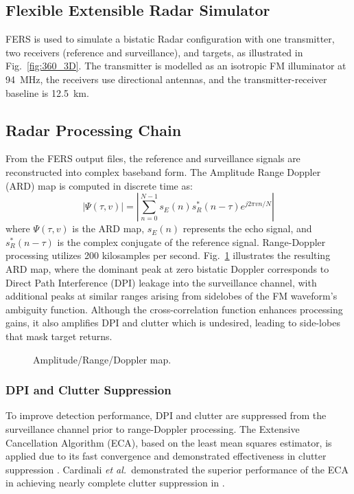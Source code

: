 \documentclass[conference]{IEEEtran}
\begin{document}
\subsection{Flexible Extensible Radar Simulator}

FERS \cite{fersMarc} is used to simulate a bistatic Radar configuration with one transmitter, two receivers (reference and surveillance), and targets, as illustrated in Fig.~\ref{fig:360_3D}. The transmitter is modelled as an isotropic FM illuminator at 94~MHz, the receivers use directional antennas, and the transmitter-receiver baseline is 12.5~km.

\subsection{Radar Processing Chain}

From the FERS output files, the reference and surveillance signals are reconstructed into complex baseband form. The Amplitude Range Doppler (ARD) map is computed in discrete time as:
\begin{equation}
  \left| \Psi(\tau, v) \right| = \left| \sum_{n=0}^{N-1} s_E(n) s_R^*(n-\tau) e^{j 2\pi v n/N} \right|
\end{equation}
where $\Psi(\tau, v)$ is the ARD map, $s_E(n)$ represents the echo signal, and $s_R^*(n-\tau)$ is the complex conjugate of the reference signal. Range-Doppler processing utilizes 200 kilosamples per second. Fig.~\ref{fig:ardMap} illustrates the resulting ARD map, where the dominant peak at zero bistatic Doppler corresponds to Direct Path Interference (DPI) leakage into the surveillance channel, with additional peaks at similar ranges arising from sidelobes of the FM waveform's ambiguity function. Although the cross-correlation function enhances processing gains, it also amplifies DPI and clutter which is undesired, leading to side-lobes that mask target returns.

\begin{figure}[t]
  \centering
  
  \caption{Amplitude/Range/Doppler map.}
  \label{fig:ardMap}
\end{figure}


\subsubsection{DPI and Clutter Suppression}

To improve detection performance, DPI and clutter are suppressed from the surveillance channel prior to range-Doppler processing. The Extensive Cancellation Algorithm (ECA), based on the least mean squares estimator, is applied due to its fast convergence and demonstrated effectiveness in clutter suppression \cite{coloneECA}. Cardinali \textit{et al.}\ demonstrated the superior performance of the ECA in achieving nearly complete clutter suppression in \cite{cardinali2007comparison, Heunis2010}.
\end{document}
